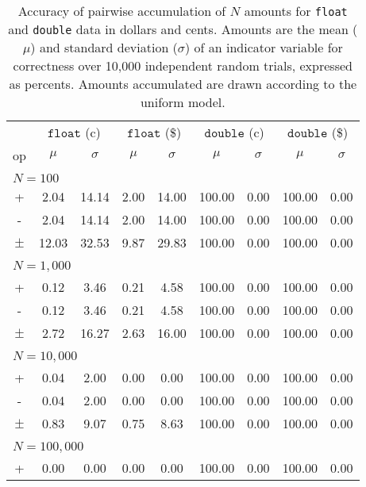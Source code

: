\documentclass[11pt, oneside]{amsart}   	%
\begin{document}
\begin{table}[ht]
\begin{center}
\caption{Accuracy of pairwise accumulation of $N$ amounts for \texttt{float} and \texttt{double} data in dollars and cents. Amounts are the mean ($\mu$) and standard deviation ($\sigma$) of an indicator variable for correctness over 10,000 independent random trials, expressed as percents. Amounts accumulated are drawn according to the uniform model.}
\label{TBL:pairwise-uniform}
\begin{tabular}{ c c c c c c c c c } 
& \multicolumn{2}{c}{$\texttt{float}$ (c)}
& \multicolumn{2}{c}{$\texttt{float}$ (\$)}
& \multicolumn{2}{c}{$\texttt{double}$ (c)}
& \multicolumn{2}{c}{$\texttt{double}$ (\$)} \\
op & $\mu$ & $\sigma$ & $\mu$ & $\sigma$ & $\mu$ & $\sigma$ & $\mu$ & $\sigma$ \\ \hline
\\ \multicolumn{9}{l}{$N = 100$} \\ \hline
+ 		& 2.04 & 14.14 & 2.00 & 14.00 & 100.00 & 0.00 & 100.00 & 0.00 \\
- 		& 2.04 & 14.14 & 2.00 & 14.00 & 100.00 & 0.00 & 100.00 & 0.00 \\
$\pm$ 	& 12.03 & 32.53 & 9.87 & 29.83 & 100.00 & 0.00 & 100.00 & 0.00 \\
\\ \multicolumn{9}{l}{$N = 1,000$} \\ \hline
+ 		& 0.12 & 3.46 & 0.21 & 4.58 & 100.00 & 0.00 & 100.00 & 0.00 \\
- 		& 0.12 & 3.46 & 0.21 & 4.58 & 100.00 & 0.00 & 100.00 & 0.00 \\
$\pm$ 	& 2.72 & 16.27 & 2.63 & 16.00 & 100.00 & 0.00 & 100.00 & 0.00 \\
\\ \multicolumn{9}{l}{$N = 10,000$} \\ \hline
+ 		& 0.04 & 2.00 & 0.00 & 0.00 & 100.00 & 0.00 & 100.00 & 0.00 \\
- 		& 0.04 & 2.00 & 0.00 & 0.00 & 100.00 & 0.00 & 100.00 & 0.00 \\
$\pm$ 	& 0.83 & 9.07 & 0.75 & 8.63 & 100.00 & 0.00 & 100.00 & 0.00 \\
\\ \multicolumn{9}{l}{$N = 100,000$} \\ \hline
+ 		& 0.00 & 0.00 & 0.00 & 0.00 & 100.00 & 0.00 & 100.00 & 0.00 \\

\end{tabular}
\end{center}
\end{table}
\end{document}
